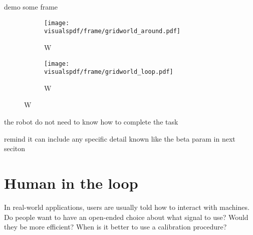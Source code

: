 demo some frame

\begin{figure}[!ht]
\centering
    \begin{subfigure}[b]{0.49\columnwidth}
        \centering
        \texttt{[image: \\visualspdf/frame/gridworld\_around.pdf]}
        \caption{W}
        \label{fig:gridwolrdgenericframesaround}
    \end{subfigure}
    \begin{subfigure}[b]{0.49\columnwidth}
        \centering
        \texttt{[image: \\visualspdf/frame/gridworld\_loop.pdf]}
        \caption{W}
        \label{fig:gridwolrdgenericframesloop}
    \end{subfigure}
\caption{W}
\label{fig:gridwolrdgenericframes}
\end{figure}


the robot do not need to know how to complete the task

remind it can include any specific detail known
like the beta param in next seciton

% 





% 


\section{Human in the loop}

In real-world applications, users are usually told how to interact with machines. Do people want to have an open-ended choice about what signal to use? Would they be more efficient? When is it better to use a calibration procedure?

